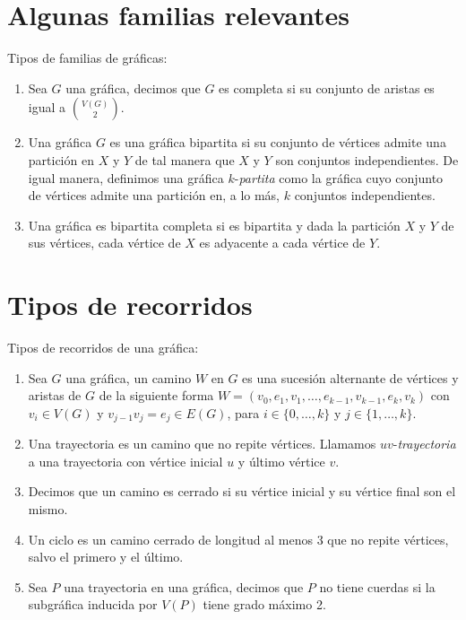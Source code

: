\section{Algunas familias relevantes}
\label{sec:famGraf}
\begin{definicion} Tipos de familias de gr\'aficas:
    \label{def:familias}
    \begin{enumerate}
        \item Sea $G$ una gr\'afica, decimos que $G$ es completa si su
        conjunto de aristas es igual a $\binom{V(G)}{2}$.
        \item Una gr\'afica $G$ es una gr\'afica bipartita si su conjunto de
        v\'ertices admite una partici\'on en $X$ y $Y$ de tal manera que $X$ y
        $Y$ son conjuntos independientes. De igual manera, definimos una
        gr\'afica $k$-\textit{partita} como la gr\'afica cuyo conjunto de
        v\'ertices admite una partici\'on en, a lo m\'as, $k$ conjuntos
        independientes.
        \item Una gr\'afica es bipartita completa si es bipartita y dada la
        partici\'on $X$ y $Y$ de sus v\'ertices, cada v\'ertice de $X$ es
        adyacente a cada v\'ertice de $Y$.   
    \end{enumerate}
\end{definicion}

\section{Tipos de recorridos}
\label{sec:recorridos}


\begin{definicion} Tipos de recorridos de una gr\'afica:
    \label{def:tipos de recorridos}
    \begin{enumerate}
        \item Sea $G$ una gr\'afica, un camino $W$ en $G$ es una sucesi\'on
        alternante de v\'ertices y aristas de $G$ de la siguiente forma $W=(v_0,
        e_1,v_1, \dots, e_{k-1},v_{k-1}, e_k,v_k)$ con $v_i \in V(G)$ y
        $v_{j-1}v_j = e_j \in E(G)$, para $i \in \{0, \dots, k\}$ y $j \in \{ 1,
        \dots, k\}$.
        \item Una trayectoria es un camino que no repite v\'ertices. Llamamos
        $uv$-\textit{trayectoria} a una trayectoria con v\'ertice inicial $u$ y
        \'ultimo v\'ertice $v$.
        \item Decimos que un camino es cerrado si su v\'ertice inicial y su
        v\'ertice final son el mismo.
        \item Un ciclo es un camino cerrado de longitud al menos $3$ que no
        repite v\'ertices, salvo el primero y el \'ultimo.
        \item Sea $P$ una trayectoria en una gr\'afica, decimos que $P$ no tiene
        cuerdas si la subgr\'afica inducida por $V(P)$ tiene grado m\'aximo 2.
    \end{enumerate}
\end{definicion}

